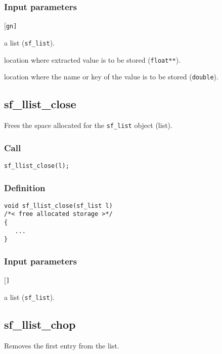 \subsubsection*{Input parameters}
\begin{desclist}{\tt }{\quad}[\tt gn]
   \setlength\itemsep{0pt}
   \item[l] a list (\texttt{sf\_list}). 
   \item[g] location where extracted value is to be stored (\texttt{float**}).  
   \item[gn] location where the name or key of the value is to be stored (\texttt{double}).  
\end{desclist}




\subsection{{sf\_llist\_close}}
Frees the space allocated for the \texttt{sf\_list} object (list).

\subsubsection*{Call}
\begin{verbatim}sf_llist_close(l);\end{verbatim}

\subsubsection*{Definition}
\begin{verbatim}
void sf_llist_close(sf_list l) 
/*< free allocated storage >*/
{
   ...
}
\end{verbatim}

\subsubsection*{Input parameters}
\begin{desclist}{\tt }{\quad}[\tt ]
   \setlength\itemsep{0pt}
   \item[l] a list (\texttt{sf\_list}).  
\end{desclist}




\subsection{{sf\_llist\_chop}}
Removes the first entry from the list.

